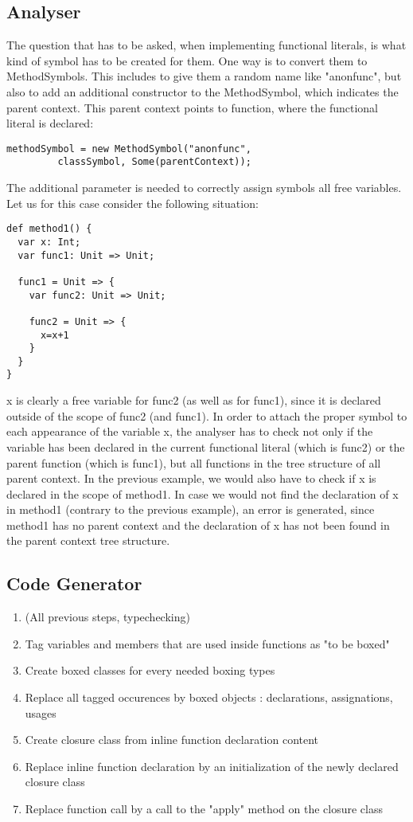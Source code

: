 \subsection{Analyser}
The question that has to be asked, when implementing functional literals, is what kind of symbol has to be created for them. One way is to convert them to MethodSymbols. This includes to give them a random name like "anonfunc", but also to add an additional constructor to the MethodSymbol, which indicates the parent context. This parent context points to function, where the functional literal is declared:
\begin{lstlisting}
methodSymbol = new MethodSymbol("anonfunc",
         classSymbol, Some(parentContext));
\end{lstlisting}
The additional parameter is needed to correctly assign symbols all free variables. Let us for this case consider the following situation:
\begin{lstlisting}
def method1() {
  var x: Int;
  var func1: Unit => Unit;

  func1 = Unit => {
    var func2: Unit => Unit;

    func2 = Unit => {
      x=x+1
    }
  }
}
\end{lstlisting}
x is clearly a free variable for func2 (as well as for func1), since it is declared outside of the scope of func2 (and func1). In order to attach the proper symbol to each appearance of the variable x, the analyser has to check not only if the variable has been declared in the current functional literal (which is func2) or the parent function (which is func1), but all functions in the tree structure of all parent context. In the previous example, we would also have to check if x is declared in the scope of method1. In case we would not find the declaration of x in method1 (contrary to the previous example), an error is generated, since method1 has no parent context and the declaration of x has not been found in the parent context tree structure.

\subsection{Code Generator}
\begin{enumerate}
\item (All previous steps, typechecking)
\item Tag variables and members that are used inside functions as "to be boxed"
\item Create boxed classes for every needed boxing types
\item Replace all tagged occurences by boxed objects : declarations, assignations, usages
\item Create closure class from inline function declaration content
\item Replace inline function declaration by an initialization of the newly declared closure class
\item Replace function call by a call to the "apply" method on the closure class
\end{enumerate}



